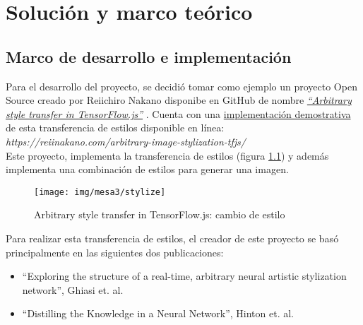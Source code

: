 \chapter{Solución y marco teórico} %
\label{cap:solucion} %
\vspace*{-2cm} %



\section{Marco de desarrollo e implementación}

Para el desarrollo del proyecto, se decidió tomar como ejemplo un proyecto Open Source creado por Reiichiro Nakano disponibe en GitHub de nombre \href{https://github.com/reiinakano/arbitrary-image-stylization-tfjs}{\emph{``Arbitrary style transfer in TensorFlow.js''}} \cite{nakanoReiinakanoArbitraryimagestylizationtfjs2020}. Cuenta con una \href{https://reiinakano.com/arbitrary-image-stylization-tfjs/}{implementación demostrativa} de esta transferencia de estilos disponible en línea: \emph{https://reiinakano.com/arbitrary-image-stylization-tfjs/}\\
Este proyecto, implementa la transferencia de estilos (figura \ref{fig:stylize}) y además implementa una combinación de estilos para generar una imagen.



\begin{figure}[H]
  \texttt{[image: img/mesa3/stylize]}
  \centering
  \caption{Arbitrary style transfer in TensorFlow.js: cambio de estilo}
  \label{fig:stylize}
\end{figure}

\clearpage


Para realizar esta transferencia de estilos, el creador de este proyecto se basó principalmente en las siguientes dos publicaciones:
\begin{itemize}
  \item ``Exploring the structure of a real-time, arbitrary neural artistic stylization network'', Ghiasi et. al. \cite{ghiasiExploringStructureRealtime2017}
  \item ``Distilling the Knowledge in a Neural Network'', Hinton et. al. \cite{hintonDistillingKnowledgeNeural2015}
\end{itemize}

